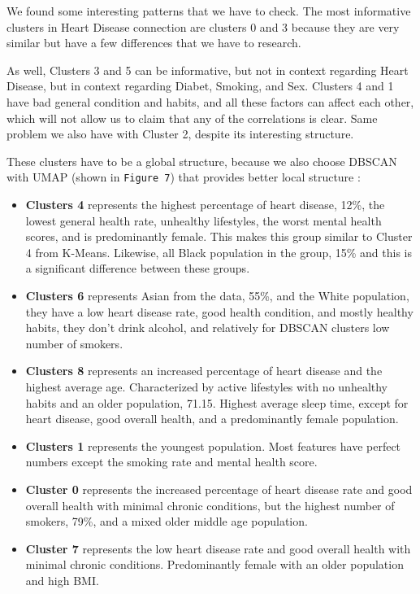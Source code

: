 \documentclass[12pt, a4paper]{article}
\begin{document}
We found some interesting patterns that we have to check. The most informative clusters in Heart Disease connection are clusters 0 and 3 because they are very similar but have a few differences that we have to research.

As well, Clusters 3 and 5 can be informative, but not in context regarding Heart Disease, but in context regarding Diabet, Smoking, and Sex. Clusters 4 and 1 have bad general condition and habits, and all these factors can affect each other, which will not allow us to claim that any of the correlations is clear. Same problem we also have with Cluster 2, despite its interesting structure. 

These clusters have to be a global structure, because we also choose DBSCAN with UMAP (shown in \texttt{Figure 7}) that provides better local structure :
\begin{itemize}
 \item \textbf{Clusters 4} represents the highest percentage of heart disease, 12\%, the lowest general health rate, unhealthy lifestyles, the worst mental health scores, and is predominantly female. This makes this group similar to Cluster 4 from K-Means. Likewise, all Black population in the group, 15\% and this is a significant difference between these groups.
\item \textbf{Clusters 6} represents Asian from the data, 55\%, and the White population, they have a low heart disease rate, good health condition, and mostly healthy habits, they don't drink alcohol, and relatively for DBSCAN clusters low number of smokers.
\item \textbf{Clusters 8} represents an increased percentage of heart disease and the highest average age. Characterized by active lifestyles with no unhealthy habits and an older population, 71.15. Highest average sleep time, except for heart disease, good overall health, and a predominantly female population. 
\item \textbf{Clusters 1} represents the youngest population. Most features have perfect numbers except the smoking rate and mental health score. 
\item \textbf{Cluster 0}  represents the increased percentage of heart disease rate and good overall health with minimal chronic conditions, but the highest number of smokers, 79\%, and a mixed older middle age population.
\item \textbf{Cluster 7} represents the low heart disease rate and good overall health with minimal chronic conditions. Predominantly female with an older population and high BMI.

\end{itemize}
\end{document}
